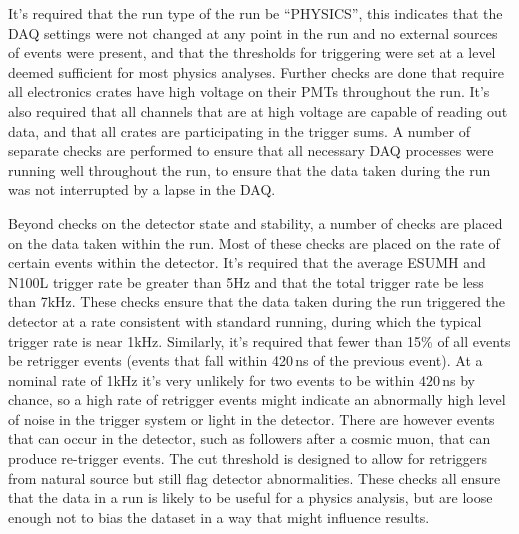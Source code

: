 It's required that the run type of the run be ``PHYSICS'', this indicates
that the DAQ settings were not changed at any point in the run and no external
sources of events were present, and that the thresholds for triggering were set
at a level deemed sufficient for most physics analyses.
Further checks are done
that require all electronics crates have high voltage on their PMTs throughout
the run.
It's also required that all channels that are at high voltage are capable of
reading out data, and that all crates are participating in the trigger sums.
A number of separate checks are performed to ensure that all necessary DAQ
processes were running well throughout the run, to ensure that the data taken
during the run was not interrupted by a lapse in the DAQ.\@

Beyond checks on the detector state and stability, a number of checks
are placed on the data taken within the run.
Most of these checks are placed on the rate of certain events within the detector.
It's required that the average ESUMH and N100L trigger rate be greater than 5Hz and
that the total trigger rate be less than 7kHz.
These checks ensure that the data taken during the run triggered the detector
at a rate consistent with standard running, during which the typical trigger
rate is near 1kHz.
Similarly, it's required that fewer than 15\% of all events be retrigger events
(events that fall within 420\,ns of the previous event).
At a nominal rate of 1kHz it's very unlikely for two events to be within $420$\,ns
by chance, so a high rate of retrigger events might indicate an abnormally
high level of noise in the trigger system or light in the detector.
There are however events that can occur
in the detector, such as followers after a cosmic muon, that can produce
re-trigger events.
The cut threshold is designed to allow for retriggers from natural source but
still flag detector abnormalities.
These checks all ensure that the data in a run is likely to be useful for
a physics analysis, but are loose enough not to bias the dataset in a way that
might influence results.

